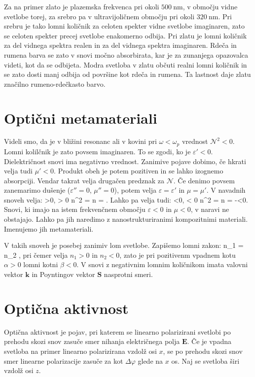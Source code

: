 Za na primer zlato je plazemska frekvenca pri okoli $500~\si{\nano\meter}$, v območju
vidne svetlobe torej, za srebro pa v ultravijoličnem območju pri okoli $320~\si{\nano\meter}$. 
Pri srebru je tako lomni količnik za celoten spekter vidne svetlobe imaginaren, zato se celoten 
spekter precej svetlobe enakomerno odbija. Pri zlatu je lomni količnik za del vidnega spektra realen in za
del vidnega spektra imaginaren. Rdeča in rumena barva se zato v snovi močno absorbirata, kar
je za zunanjega opazovalca videti, kot da se odbijeta. Modra svetloba v zlatu občuti
realni lomni količnik in se zato dosti manj odbija od površine kot rdeča in rumena. Ta
lastnost daje zlatu značilno rumeno-rdečkasto barvo. 


\section{Optični metamateriali}
Videli smo, da je v bližini resonanc ali v kovini pri $\omega <\omega_p$ vrednost $\mathcal{N}^2 <0$.
Lomni kolilčnik je zato povsem imaginaren. To se zgodi, ko je $\varepsilon'<0$. Dielektričnost
snovi ima negativno vrednost. Zanimive pojave dobimo, če hkrati velja tudi $\mu'<0$. Produkt
obeh je potem pozitiven in se lahko izognemo absorpciji. Vendar takrat velja drugačen
predznak za $\mathcal{N}$. Če denimo povsem zanemarimo dušenje ($\varepsilon''=0$, $\mu''=0$), 
potem velja $\varepsilon=\varepsilon'$ in $\mu  = \mu'$.
V navadnih snoveh velja:
\beq
\varepsilon >0, \mu > 0 \qquad \Rightarrow \qquad n^2 = \varepsilon \mu 
\qquad \Rightarrow \qquad n = \sqrt{\varepsilon\mu}. 
\label{eq:09_37m}
\eeq
Lahko pa velja tudi:
\beq
\varepsilon <0, \mu < 0 \qquad \Rightarrow \qquad n^2 = \varepsilon \mu 
\qquad \Rightarrow \qquad n = -\sqrt{\varepsilon\mu}<0. 
\label{eq:09_38}
\eeq
Snovi, ki imajo na istem frekvenčnem območju $\varepsilon<0$ in $\mu<0$, v naravi ne 
obstajajo. Lahko pa jih naredimo z nanostrukturiranimi kompozitnimi materiali. Imenujemo
jih metamateriali. 

V takih snoveh je posebej zanimiv lom svetlobe. Zapišemo lomni zakon:
\beq
n_1 \sin\alpha = n_2 \sin\beta,
\label{eq:09_39}
\eeq
pri čemer velja $n_1>0$ in $n_2<0$, zato je pri pozitivenm vpadnem kotu $\alpha >0$
lomni kotni $\beta <0$. V snovi z negativnim lomnim količnikom imata valovni vektor
$\mathbf{k}$ in Poyntingov vektor $\mathbf{S}$ nasprotni smeri.

\section{Optična aktivnost}
Optična aktivnost je pojav, pri katerem se linearno polarizirani svetlobi po prehodu
skozi snov zasuče smer nihanja električnega polja $\mathbf{E}$. Če je vpadna svetloba na primer
linearno polarizirana vzdolž osi $x$, se po prehodu skozi snov smer linearne polarizacije
zasuče za kot $\Delta \varphi$ glede na $x$ os. Naj se svetloba širi vzdolž osi $z$.

